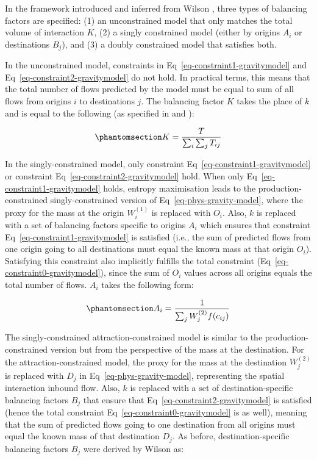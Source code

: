 \documentclass[
  10pt,
  letterpaper,
]{article}
\begin{document}
In the framework introduced and inferred from Wilson \citep{wilson1971},
three types of balancing factors are specified: (1) an unconstrained
model that only matches the total volume of interaction \(K\), (2) a
singly constrained model (either by origins \(A_i\) or destinations
\(B_j\)), and (3) a doubly constrained model that satisfies both.

In the unconstrained model, constraints in
Eq~\ref{eq-constraint1-gravitymodel} and
Eq~\ref{eq-constraint2-gravitymodel} do not hold. In practical terms,
this means that the total number of flows predicted by the model must be
equal to sum of all flows from origins \(i\) to destinations \(j\). The
balancing factor \(K\) takes the place of \(k\) and is equal to the
following (as specified in \citep{cliff_evaluating_1974} and
\citep{fotheringham_spatial_1984}):

\begin{equation}\phantomsection\label{eq-total-flow-balancing-factor}{
K=\frac{T}{\sum_i\sum_j T_{ij}}
}\end{equation}

In the singly-constrained model, only constraint
Eq~\ref{eq-constraint1-gravitymodel} or constraint
Eq~\ref{eq-constraint2-gravitymodel} hold. When only
Eq~\ref{eq-constraint1-gravitymodel} holds, entropy maximisation leads
to the production-constrained singly-constrained version of
Eq~\ref{eq-phys-gravity-model}, where the proxy for the mass at the
origin \(W_i^{(1)}\) is replaced with \(O_i\). Also, \(k\) is replaced
with a set of balancing factors specific to origins \(A_i\) which
ensures that constraint Eq~\ref{eq-constraint1-gravitymodel} is
satisfied (i.e., the sum of predicted flows from one origin going to all
destinations must equal the known mass at that origin \(O_i\)).
Satisfying this constraint also implicitly fulfills the total constraint
(Eq~\ref{eq-constraint0-gravitymodel}), since the sum of \(O_i\) values
across all origins equals the total number of flows. \(A_i\) takes the
following form:

\begin{equation}\phantomsection\label{eq-production-constrained-balancing-factor}{
A_i = \frac{1}{\sum_j W_j^{(2)} f(c_{ij})}
}\end{equation}

The singly-constrained attraction-constrained model is similar to the
production-constrained version but from the perspective of the mass at
the destination. For the attraction-constrained model, the proxy for the
mass at the destination \(W_j^{(2)}\) is replaced with \(D_j\) in
Eq~\ref{eq-phys-gravity-model}, representing the spatial interaction
inbound flow. Also, \(k\) is replaced with a set of destination-specific
balancing factors \(B_j\) that ensure that
Eq~\ref{eq-constraint2-gravitymodel} is satisfied (hence the total
constraint Eq~\ref{eq-constraint0-gravitymodel} is as well), meaning
that the sum of predicted flows going to one destination from all
origins must equal the known mass of that destination \(D_j\). As
before, destination-specific balancing factors \(B_j\) were derived by
Wilson as:
\end{document}
